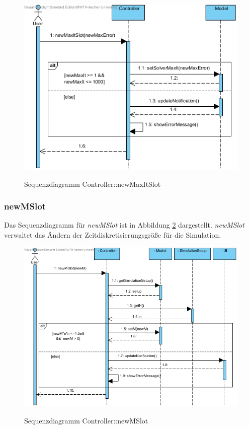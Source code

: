 \begin{figure}[H]
	\centering
	\includegraphics[scale=.65]{Bilder/Controller__newMaxItSlot().jpg}\\
	\caption{Sequenzdiagramm Controller::newMaxItSlot}
	\label{Sequenzdiagramm Controller::newMaxItSlot}
\end{figure}

\subsubsection*{newMSlot}

Das Sequenzdiagramm für \emph{newMSlot} ist in Abbildung \ref{Sequenzdiagramm Controller::newMSlot} dargestellt. \emph{newMSlot} verwaltet das Ändern der Zeitdiskretisierungsgröße für die Simulation.

\begin{figure}[H]
	\centering
	\includegraphics[scale=.6]{Bilder/Controller__newMSlot().jpg}\\
	\caption{Sequenzdiagramm Controller::newMSlot}
	\label{Sequenzdiagramm Controller::newMSlot}
\end{figure}

